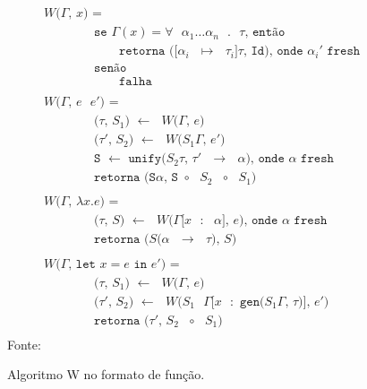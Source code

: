 \begin{figure}[ht!]
  \caption{Algoritmo W no formato de função.}
  \centering
  \begin{align*}
     & \texttt{$W$($\Gamma$, $x$) = }                                                                                     \\
     & \qquad{}\qquad{}\texttt{se $\Gamma(x) = \forall$ $\alpha_1 \ldots \alpha_n$ $.$ $\tau$, então}                     \\
     & \qquad{}\qquad{}\qquad{}\texttt{retorna ([$\alpha_i$ $\mapsto$ $\tau_i$]$\tau$, Id), onde $\alpha_i'$ fresh}       \\
     & \qquad{}\qquad{}\texttt{senão}                                                                                     \\
     & \qquad{}\qquad{}\qquad{}\texttt{falha}                                                                             \\
    \\
     & \texttt{$W$($\Gamma$, $e$ $e'$) = }                                                                                \\
     & \qquad{}\qquad{}\texttt{($\tau$, $S_1$) $\leftarrow$ $W$($\Gamma$, $e$)}                                           \\
     & \qquad{}\qquad{}\texttt{($\tau'$, $S_2$) $\leftarrow$ $W$($S_1\Gamma$, $e'$)}                                      \\
     & \qquad{}\qquad{}\texttt{S $\leftarrow$ unify($S_2\tau$, $\tau'$ $\to$ $\alpha$), onde $\alpha$ fresh}              \\
     & \qquad{}\qquad{}\texttt{retorna (S$\alpha$, S $\circ$ $S_2$ $\circ$ $S_1$)}                                        \\
    \\
     & \texttt{$W$($\Gamma$, $\lambda x.e$) = }                                                                           \\
     & \qquad{}\qquad{}\texttt{($\tau$, $S$) $\leftarrow$ $W$($\Gamma$[$x$ $:$ $\alpha$], $e$), onde $\alpha$ fresh}      \\
     & \qquad{}\qquad{}\texttt{retorna ($S$($\alpha$ $\to$ $\tau$), $S$)}                                                 \\
    \\
     & \texttt{$W$($\Gamma$, let $x = e$ in $e'$) = }                                                                     \\
     & \qquad{}\qquad{}\texttt{($\tau$, $S_1$) $\leftarrow$ $W$($\Gamma$, $e$)}                                           \\
     & \qquad{}\qquad{}\texttt{($\tau'$, $S_2$) $\leftarrow$ $W$($S_1$ $\Gamma$[$x$ $:$ gen($S_1\Gamma$, $\tau$)], $e'$)} \\
     & \qquad{}\qquad{}\texttt{retorna ($\tau'$, $S_2$ $\circ$ $S_1$)}                                                    \\
  \end{align*}
  \small{Fonte:~\cite{CASTRO2019}}\label{fig:algoritmo-w}
\end{figure}

